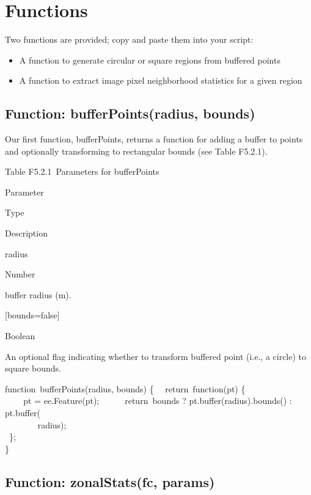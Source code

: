 \documentclass[
  letterpaper,
  DIV=11,
  numbers=noendperiod]{scrreprt}
\providecommand{\tightlist}{%
  \setlength{\itemsep}{0pt}\setlength{\parskip}{0pt}}\usepackage{longtable,booktabs,array}
\begin{document}
\hypertarget{functions-1}{%
\section{Functions}\label{functions-1}}

Two functions are provided; copy and paste them into your script:

\begin{itemize}
\tightlist
\item
  A function to generate circular or square regions from buffered points
\item
  A function to extract image pixel neighborhood statistics for a given
  region
\end{itemize}

\hypertarget{function-bufferpointsradius-bounds}{%
\subsection{Function: bufferPoints(radius,
bounds)}\label{function-bufferpointsradius-bounds}}

Our first function, bufferPoints, returns a function for adding a buffer
to points and optionally transforming to rectangular bounds (see Table
F5.2.1).

Table F5.2.1~Parameters for bufferPoints

Parameter

Type

Description

radius

Number

buffer radius (m).

{[}bounds=false{]}

Boolean

An optional flag indicating whether to transform buffered point (i.e., a
circle) to square bounds.

function~bufferPoints(radius, bounds) \{~ ~return~function(pt) \{\\
\hspace*{0.333em} ~ ~ ~pt = ee.Feature(pt);~ ~ ~ ~return~bounds ?
pt.buffer(radius).bounds() : pt.buffer(\\
\hspace*{0.333em} ~ ~ ~ ~ ~radius);\\
\hspace*{0.333em} ~\};\\
\}

\hypertarget{function-zonalstatsfc-params}{%
\subsection{Function: zonalStats(fc,
params)}\label{function-zonalstatsfc-params}}
\end{document}
